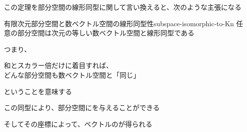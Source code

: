 \documentclass[../../../topic_linear-algebra]{subfiles}
\begin{document}
この定理を部分空間の線形同型に関して言い換えると、次のような主張になる

\begin{theorem}{有限次元部分空間と数ベクトル空間の線形同型性}{subspace-isomorphic-to-Kn}
  任意の部分空間は次元の等しい数ベクトル空間と線形同型である
\end{theorem}

つまり、
\begin{shaded}
  和とスカラー倍だけに着目すれば、\\
  どんな部分空間も数ベクトル空間と「同じ」
\end{shaded}
ということを意味する

\br

この同型により、部分空間にを与えることができる

そしてその座標によって、ベクトルのが得られる
\end{document}
